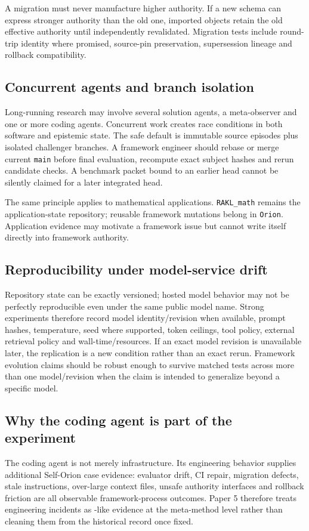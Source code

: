 A migration must never manufacture higher authority. If a new schema can express stronger authority than the old one, imported objects retain the old effective authority until independently revalidated. Migration tests include round-trip identity where promised, source-pin preservation, supersession lineage and rollback compatibility.

\subsection{Concurrent agents and branch isolation}

Long-running research may involve several solution agents, a meta-observer and one or more coding agents. Concurrent work creates race conditions in both software and epistemic state. The safe default is immutable source episodes plus isolated challenger branches. A framework engineer should rebase or merge current \texttt{main} before final evaluation, recompute exact subject hashes and rerun candidate checks. A benchmark packet bound to an earlier head cannot be silently claimed for a later integrated head.

The same principle applies to mathematical applications. \texttt{RAKL\_math} remains the application-state repository; reusable framework mutations belong in \texttt{Orion}. Application evidence may motivate a framework issue but cannot write itself directly into framework authority.

\subsection{Reproducibility under model-service drift}

Repository state can be exactly versioned; hosted model behavior may not be perfectly reproducible even under the same public model name. Strong experiments therefore record model identity/revision when available, prompt hashes, temperature, seed where supported, token ceilings, tool policy, external retrieval policy and wall-time/resources. If an exact model revision is unavailable later, the replication is a new condition rather than an exact rerun. Framework evolution claims should be robust enough to survive matched tests across more than one model/revision when the claim is intended to generalize beyond a specific model.

\subsection{Why the coding agent is part of the experiment}

The coding agent is not merely infrastructure. Its engineering behavior supplies additional Self-Orion case evidence: evaluator drift, CI repair, migration defects, stale instructions, over-large context files, unsafe authority interfaces and rollback friction are all observable framework-process outcomes. Paper 5 therefore treats engineering incidents as \TaskEpisode{}-like evidence at the meta-method level rather than cleaning them from the historical record once fixed.